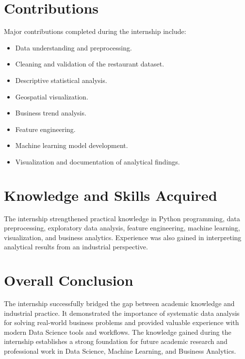 \documentclass[12pt,a4paper]{report}
\begin{document}
\section{Contributions}

Major contributions completed during the internship include:

\begin{itemize}
\item Data understanding and preprocessing.
\item Cleaning and validation of the restaurant dataset.
\item Descriptive statistical analysis.
\item Geospatial visualization.
\item Business trend analysis.
\item Feature engineering.
\item Machine learning model development.
\item Visualization and documentation of analytical findings.
\end{itemize}

\section{Knowledge and Skills Acquired}

The internship strengthened practical knowledge in Python programming, data preprocessing, exploratory data analysis, feature engineering, machine learning, visualization, and business analytics. Experience was also gained in interpreting analytical results from an industrial perspective.

\section{Overall Conclusion}

The internship successfully bridged the gap between academic knowledge and industrial practice. It demonstrated the importance of systematic data analysis for solving real-world business problems and provided valuable experience with modern Data Science tools and workflows. The knowledge gained during the internship establishes a strong foundation for future academic research and professional work in Data Science, Machine Learning, and Business Analytics.

\end{document}

